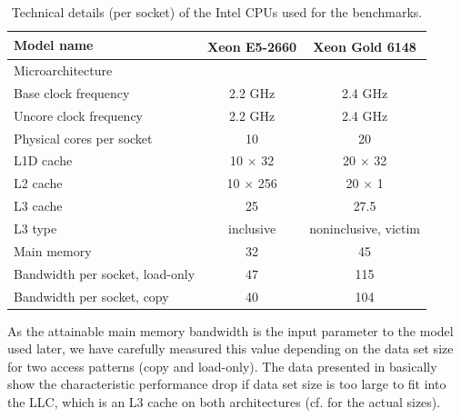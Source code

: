 \begin{table}[t]
	\centering
	\caption{Technical details (per socket) of the Intel CPUs used for the benchmarks.\label{tab:test_bed}}
	\begin{center}
		\begin{tabular}{l|cc}
			{Model name} & {Xeon\textsuperscript{\textregistered} E5-2660} & {Xeon\textsuperscript{\textregistered} Gold 6148} \\\midrule
			{Microarchitecture} & {\IVB} & {\SKX} \\\midrule
			{Base clock frequency} & {2.2 GHz} & {2.4 GHz}\\
			{Uncore clock frequency} & {2.2 GHz} & {2.4 GHz}\\
			{Physical cores per socket} & {10} & {20} \\
			{L1D cache} & {10 $\times$ 32 \KiB} & {20 $\times$ 32 \KiB}\\
			{L2 cache} & {10 $\times$ 256 \KiB} & {20 $\times$ 1 \MiB} \\
			{L3 cache} & {25 \MiB} & {27.5 \MiB}\\
			{L3 type} & {inclusive} & {noninclusive, victim}\\
			{Main memory} & {32 \GiB} & {45 \GiB}\\
			{Bandwidth per socket, load-only} & {47 \GBS} & {115 \GBS}\\ %
			{Bandwidth per socket, copy} & {40 \GBS} & {104 \GBS}\\
		\end{tabular}
	\end{center}
\end{table} 
As the attainable main memory bandwidth is the input parameter to the \roofline model used later, we have carefully measured this value depending on the data set size for two access patterns (copy and load-only). The data presented in  basically show the characteristic performance drop if data set size is too large to fit into the \acrfull{LLC}, which is an L3 cache on both architectures (cf.  for the actual sizes). 
